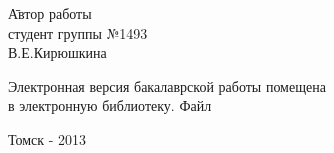 \begin{tabbing}
\hspace{10cm}\=Автор работы\\
\>студент группы №1493\\
\>\makebox[3cm]{\hrulefill}В.Е.Кирюшкина\\
\end{tabbing}

\vspace{0.8cm}

\hspace{-0.65cm}Электронная версия бакалаврской работы помещена\\
в электронную библиотеку. Файл

\vspace{1.2cm}

\begin{center}
Томск - 2013
\end{center}
\normalsize
